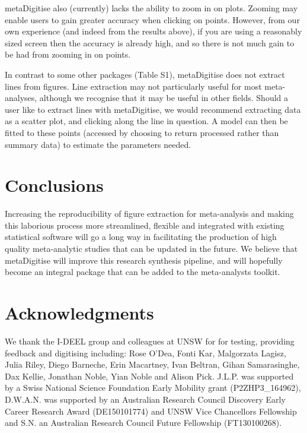 \documentclass[12pt]{article}
\newcommand{\pkg}[1]{{\fontseries{b}\selectfont #1}}
\begin{document}
\pkg{metaDigitise} also (currently) lacks the ability to zoom in on plots. Zooming may enable users to gain greater accuracy when clicking on points. However, from our own experience (and indeed from the results above), if you are using a reasonably sized screen then the accuracy is already high, and so there is not much gain to be had from zooming in on points.

In contrast to some other packages (Table S1), \pkg{metaDigitise} does not extract lines from figures. Line extraction may not particularly useful for most meta-analyses, although we recognise that it may be useful in other fields. Should a user like to extract lines with \pkg{metaDigitise}, we would recommend extracting data as a scatter plot, and clicking along the line in question. A model can then be fitted to these points (accessed by choosing to return processed rather than summary data) to estimate the parameters needed.





\section{Conclusions}
Increasing the reproducibility of figure extraction for meta-analysis and making this laborious process more streamlined, flexible and integrated with existing statistical software will go a long way in facilitating the production of high quality meta-analytic studies that can be updated in the future. We believe that \pkg{metaDigitise} will improve this research synthesis pipeline, and will hopefully become an integral package that can be added to the meta-analysts toolkit.

\section*{Acknowledgments}
We thank the I-DEEL group and colleagues at UNSW for for testing, providing feedback and digitising including: Rose O'Dea, Fonti Kar, Malgorzata Lagisz, Julia Riley, Diego Barneche, Erin Macartney, Ivan Beltran, Gihan Samarasinghe, Dax Kellie, Jonathan Noble, Yian Noble and Alison Pick. J.L.P. was supported by a Swiss National Science Foundation Early Mobility grant (P2ZHP3\_164962), D.W.A.N. was supported by an Australian Research Council Discovery Early Career Research Award (DE150101774) and UNSW Vice Chancellors Fellowship and S.N. an Australian Research Council Future Fellowship (FT130100268). 
\end{document}
